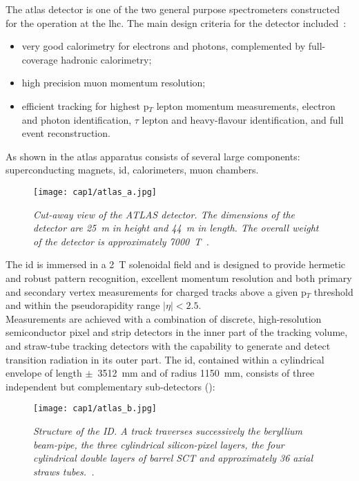 \hskip 1cm The \gls{atlas} detector is one of the two general purpose
spectrometers constructed for the operation at the \gls{lhc}. The main design
criteria for the detector included~\cite{Turala}:
\begin{itemize}
\item very good calorimetry for electrons and photons, complemented by
  full-coverage hadronic calorimetry;
\item high precision muon momentum resolution;
\item efficient tracking for highest p$_T$ lepton momentum measurements,
  electron and photon identification, $\tau$ lepton and heavy-flavour
  identification, and full event reconstruction.
\end{itemize}
As shown in  the \gls{atlas} apparatus consists of several large
components: superconducting magnets, \gls{id}, calorimeters, muon chambers.
\begin{figure}[!htbp]
  \centering
  \texttt{[image: cap1/atlas\_a.jpg]}
  \caption{\textit{Cut-away view of the ATLAS detector. The dimensions of the
      detector are 25~m in height and 44~m in length. The overall weight of the
      detector is approximately 7000~T~\cite{ATLASatCERN}.}}\label{atlas_a}
\end{figure}
The \gls{id} is immersed in a 2~T solenoidal field and is designed to provide
hermetic and robust pattern recognition, excellent momentum resolution and both
primary and secondary vertex measurements for charged tracks above a given p$_T$
threshold and within the
pseudorapidity range $|\eta| < 2.5$.\\
Measurements are achieved with a combination of discrete, high-resolution
semiconductor pixel and strip detectors in the inner part of the tracking
volume, and straw-tube tracking detectors with the capability to generate and
detect transition radiation in its outer part.  The \gls{id}, contained within a
cylindrical envelope of length $\pm$~3512~mm and of radius 1150~mm, consists of
three independent but complementary sub-detectors ():
\begin{figure}[!htbp]
  \centering
  \texttt{[image: cap1/atlas\_b.jpg]}
  \caption{\textit{Structure of the ID. A track traverses successively the
      beryllium beam-pipe, the three cylindrical silicon-pixel layers, the four
      cylindrical double layers of barrel SCT and approximately 36 axial straws
      tubes.~\cite{ATLASatCERN}.}}\label{atlas_b}
\end{figure}
